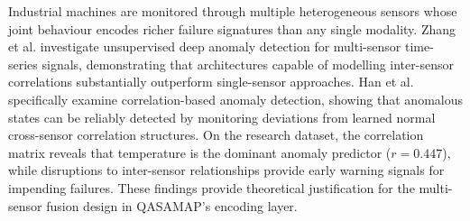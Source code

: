 

Industrial machines are monitored through multiple heterogeneous sensors whose joint behaviour encodes richer failure signatures than any single modality. Zhang et al. \cite{zhang_unsupervised_2021} investigate unsupervised deep anomaly detection for multi-sensor time-series signals, demonstrating that architectures capable of modelling inter-sensor correlations substantially outperform single-sensor approaches. Han et al. \cite{Han2022} specifically examine correlation-based anomaly detection, showing that anomalous states can be reliably detected by monitoring deviations from learned normal cross-sensor correlation structures. On the research dataset, the correlation matrix reveals that temperature is the dominant anomaly predictor ($r = 0.447$), while disruptions to inter-sensor relationships provide early warning signals for impending failures. These findings provide theoretical justification for the multi-sensor fusion design in QASAMAP's encoding layer.


